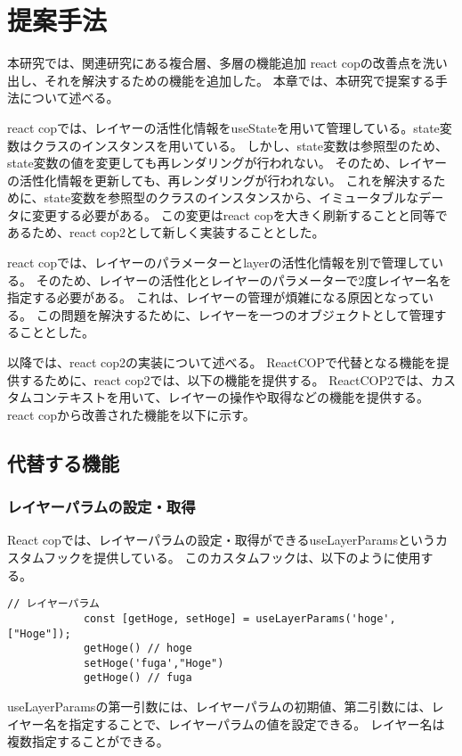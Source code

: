 \documentclass{jsarticle}
\begin{document}
    \fi
    \section{提案手法}
    本研究では、関連研究にある複合層、多層の機能追加
    react copの改善点を洗い出し、それを解決するための機能を追加した。
    本章では、本研究で提案する手法について述べる。

    react copでは、レイヤーの活性化情報をuseStateを用いて管理している。state変数はクラスのインスタンスを用いている。
    しかし、state変数は参照型のため、state変数の値を変更しても再レンダリングが行われない。
    そのため、レイヤーの活性化情報を更新しても、再レンダリングが行われない。
    これを解決するために、state変数を参照型のクラスのインスタンスから、イミュータブルなデータに変更する必要がある。
    この変更はreact copを大きく刷新することと同等であるため、react cop2として新しく実装することとした。

    react copでは、レイヤーのパラメーターとlayerの活性化情報を別で管理している。
    そのため、レイヤーの活性化とレイヤーのパラメーターで2度レイヤー名を指定する必要がある。
    これは、レイヤーの管理が煩雑になる原因となっている。
    この問題を解決するために、レイヤーを一つのオブジェクトとして管理することとした。

    以降では、react cop2の実装について述べる。
    ReactCOPで代替となる機能を提供するために、react cop2では、以下の機能を提供する。
    ReactCOP2では、カスタムコンテキストを用いて、レイヤーの操作や取得などの機能を提供する。
    react copから改善された機能を以下に示す。



    \subsection{代替する機能}
    \subsubsection{レイヤーパラムの設定・取得}
        React copでは、レイヤーパラムの設定・取得ができるuseLayerParamsというカスタムフックを提供している。
        このカスタムフックは、以下のように使用する。
        \begin{lstlisting}[]
            // レイヤーパラム
            const [getHoge, setHoge] = useLayerParams('hoge', ["Hoge"]);
            getHoge() // hoge
            setHoge('fuga',"Hoge")
            getHoge() // fuga

        \end{lstlisting}
        useLayerParamsの第一引数には、レイヤーパラムの初期値、第二引数には、レイヤー名を指定することで、レイヤーパラムの値を設定できる。
        レイヤー名は複数指定することができる。
\end{document}
